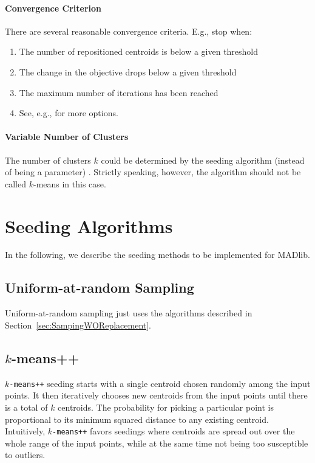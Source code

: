 \documentclass[letterpaper,11pt]{scrreprt}
\numberwithin{equation}{section}
\theoremstyle{algorithm}
\begin{document}
\paragraph{Convergence Criterion}

There are several reasonable convergence criteria. E.g., stop when:
\begin{enumerate}
	\item The number of repositioned centroids is below a given threshold
	\item The change in the objective drops below a given threshold
	\item The maximum number of iterations has been reached
	\item See, e.g., \textcite[Section~16.4]{CS08a} for more options.
\end{enumerate}

\paragraph{Variable Number of Clusters}

The number of clusters $k$ could be determined by the seeding algorithm (instead of being a parameter) \cite{MNU00a}. Strictly speaking, however, the algorithm should not be called $k$-means in this case.


\section{Seeding Algorithms}

In the following, we describe the seeding methods to be implemented for MADlib.

\subsection{Uniform-at-random Sampling}

Uniform-at-random sampling just uses the algorithms described in Section~\ref{sec:SampingWOReplacement}.

\subsection[k-means++]{$k$-means++}

\texttt{$k$-means++} seeding \cite{AV07a} starts with a single centroid chosen randomly among the input points. It then iteratively chooses new centroids from the input points until there is a total of $k$ centroids. The probability for picking a particular point is proportional to its minimum squared distance to any existing centroid. Intuitively, \texttt{$k$-means++} favors seedings where centroids are spread out over the whole range of the input points, while at the same time not being too susceptible to outliers.
\end{document}
